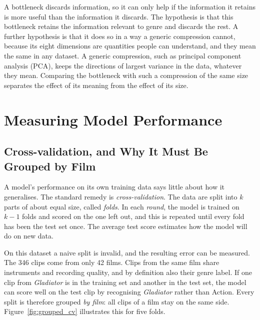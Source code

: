 A bottleneck discards information, so it can only help if the information it retains is more useful than the information it discards. The hypothesis is that this bottleneck retains the information relevant to genre and discards the rest. A further hypothesis is that it does so in a way a generic compression cannot, because its eight dimensions are quantities people can understand, and they mean the same in any dataset. A generic compression, such as principal component analysis (PCA), keeps the directions of largest variance in the data, whatever they mean. Comparing the bottleneck with such a compression of the same size separates the effect of its meaning from the effect of its size.

\section{Measuring Model Performance}
\label{sec:fund_evaluation}

\subsection{Cross-validation, and Why It Must Be Grouped by Film}

A model's performance on its own training data says little about how it generalises. The standard remedy is \emph{cross-validation}. The data are split into $k$ parts of about equal size, called \emph{folds}. In each \emph{round}, the model is trained on $k-1$ folds and scored on the one left out, and this is repeated until every fold has been the test set once. The average test score estimates how the model will do on new data.

On this dataset a naive split is invalid, and the resulting error can be measured. The 346 clips come from only 42 films. Clips from the same film share instruments and recording quality, and by definition also their genre label. If one clip from \emph{Gladiator} is in the training set and another in the test set, the model can score well on the test clip by recognising \emph{Gladiator} rather than Action. Every split is therefore grouped \emph{by film}: all clips of a film stay on the same side. Figure~\ref{fig:grouped_cv} illustrates this for five folds.

